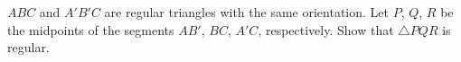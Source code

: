 $ABC$ and $A'B'C$ are regular triangles with the same orientation. Let $P$, $Q$, $R$ be the midpoints of the segments $AB'$, $BC$, $A'C$, respectively. Show that $\triangle PQR$ is regular.
